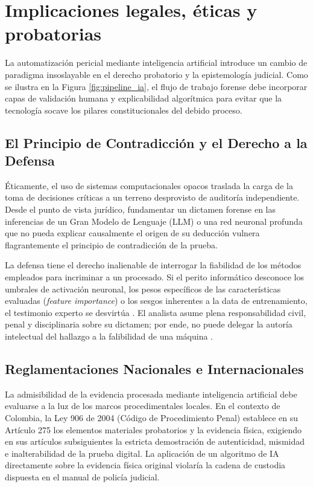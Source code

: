 \documentclass[journal]{IEEEtran}
\begin{document}
\section{Implicaciones legales, éticas y probatorias}
La automatización pericial mediante inteligencia artificial introduce un cambio de paradigma insoslayable en el derecho probatorio y la epistemología judicial. Como se ilustra en la Figura \ref{fig:pipeline_ia}, el flujo de trabajo forense debe incorporar capas de validación humana y explicabilidad algorítmica para evitar que la tecnología socave los pilares constitucionales del debido proceso.

\subsection{El Principio de Contradicción y el Derecho a la Defensa}
Éticamente, el uso de sistemas computacionales opacos traslada la carga de la toma de decisiones críticas a un terreno desprovisto de auditoría independiente. Desde el punto de vista jurídico, fundamentar un dictamen forense en las inferencias de un Gran Modelo de Lenguaje (LLM) o una red neuronal profunda que no pueda explicar causalmente el origen de su deducción vulnera flagrantemente el principio de contradicción de la prueba.

La defensa tiene el derecho inalienable de interrogar la fiabilidad de los métodos empleados para incriminar a un procesado. Si el perito informático desconoce los umbrales de activación neuronal, los pesos específicos de las características evaluadas (\textit{feature importance}) o los sesgos inherentes a la data de entrenamiento, el testimonio experto se desvirtúa \cite{HermosillaPamela2025EAfF}. El analista asume plena responsabilidad civil, penal y disciplinaria sobre su dictamen; por ende, no puede delegar la autoría intelectual del hallazgo a la falibilidad de una máquina \cite{SharmaDevanshu2026LaEI}.

\subsection{Reglamentaciones Nacionales e Internacionales}
La admisibilidad de la evidencia procesada mediante inteligencia artificial debe evaluarse a la luz de los marcos procedimentales locales. En el contexto de Colombia, la Ley 906 de 2004 (Código de Procedimiento Penal) \cite{Ley906_2004} establece en su Artículo 275 los elementos materiales probatorios y la evidencia física, exigiendo en sus artículos subsiguientes la estricta demostración de autenticidad, mismidad e inalterabilidad de la prueba digital. La aplicación de un algoritmo de IA directamente sobre la evidencia física original violaría la cadena de custodia dispuesta en el manual de policía judicial.
\end{document}
